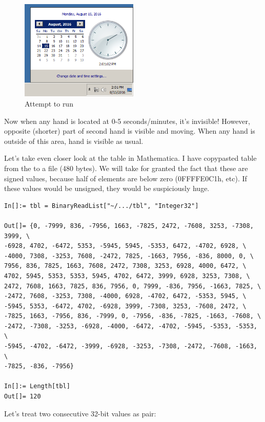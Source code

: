 \begin{figure}[H]
\centering
\includegraphics[width=0.5\textwidth]{examples/timedate/6_pairs_zeroed.png}
\caption{Attempt to run}
\end{figure}

Now when any hand is located at 0-5 seconds/minutes, it's invisible! However, opposite (shorter) part of second hand
is visible and moving.
When any hand is outside of this area, hand is visible as usual.

Let's take even closer look at the table in Mathematica.
I have copypasted table from the  to a  file (480 bytes).
We will take for granted the fact that these are signed values, because half of elements are below zero (0FFFFE0C1h, etc).
If these values would be unsigned, they would be suspiciously huge.

\begin{lstlisting}
In[]:= tbl = BinaryReadList["~/.../tbl", "Integer32"]

Out[]= {0, -7999, 836, -7956, 1663, -7825, 2472, -7608, 3253, -7308, 3999, \
-6928, 4702, -6472, 5353, -5945, 5945, -5353, 6472, -4702, 6928, \
-4000, 7308, -3253, 7608, -2472, 7825, -1663, 7956, -836, 8000, 0, \
7956, 836, 7825, 1663, 7608, 2472, 7308, 3253, 6928, 4000, 6472, \
4702, 5945, 5353, 5353, 5945, 4702, 6472, 3999, 6928, 3253, 7308, \
2472, 7608, 1663, 7825, 836, 7956, 0, 7999, -836, 7956, -1663, 7825, \
-2472, 7608, -3253, 7308, -4000, 6928, -4702, 6472, -5353, 5945, \
-5945, 5353, -6472, 4702, -6928, 3999, -7308, 3253, -7608, 2472, \
-7825, 1663, -7956, 836, -7999, 0, -7956, -836, -7825, -1663, -7608, \
-2472, -7308, -3253, -6928, -4000, -6472, -4702, -5945, -5353, -5353, \
-5945, -4702, -6472, -3999, -6928, -3253, -7308, -2472, -7608, -1663, \
-7825, -836, -7956}

In[]:= Length[tbl]
Out[]= 120
\end{lstlisting}

Let's treat two consecutive 32-bit values as pair:

